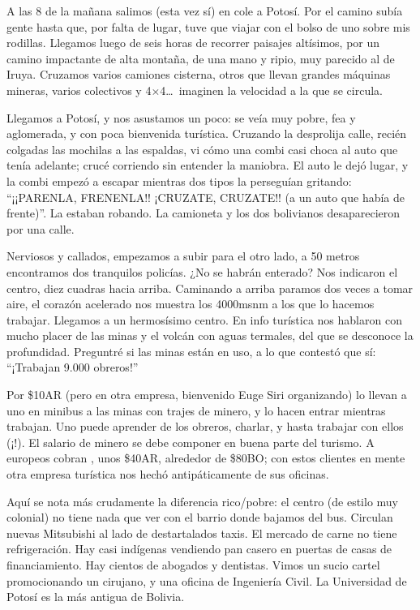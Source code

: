 A las 8 de la mañana salimos (esta vez sí) en cole a Potosí. Por el camino
subía gente hasta que, por falta de lugar, tuve que viajar con el bolso de uno
sobre mis rodillas. Llegamos luego de seis horas de recorrer paisajes
altísimos, por un camino impactante de alta montaña, de una mano y ripio, muy
parecido al de Iruya. Cruzamos varios camiones cisterna, otros que llevan
grandes máquinas mineras, varios colectivos y 4$\times$4\ldots\ imaginen la
velocidad a la que se circula.

Llegamos a Potosí, y nos asustamos un poco: se veía muy pobre, fea y
aglomerada, y con poca bienvenida turística. Cruzando la desprolija calle,
recién colgadas las mochilas a las espaldas, vi cómo una combi casi choca al
auto que tenía adelante; crucé corriendo sin entender la maniobra. El auto le
dejó lugar, y la combi empezó a escapar mientras dos tipos la perseguían
gritando: ``¡¡PARENLA, FRENENLA!! \textexclamdown
¡CRUZATE, CRUZATE!! (a un auto que había de frente)''. La
estaban robando. La camioneta y los dos bolivianos desaparecieron por una calle.

Nerviosos y callados, empezamos a subir para el otro lado, a 50 metros
encontramos dos tranquilos policías. ¿No se habrán enterado?
Nos indicaron el centro, diez cuadras hacia arriba. Caminando a arriba paramos
dos veces a tomar aire, el corazón acelerado nos muestra los 4000msnm a los que
lo hacemos trabajar. Llegamos a un hermosísimo centro. En info turística nos
hablaron con mucho placer de las minas y el volcán con aguas termales, del que
se desconoce la profundidad. Preguntré si las minas están en uso, a lo que
contestó que sí: ``¡Trabajan 9.000 obreros!''

Por \$10{\small AR} (pero en otra empresa, bienvenido Euge Siri
organizando) lo llevan a uno en minibus a las minas con trajes de minero, y lo
hacen entrar mientras trabajan. Uno puede aprender de los obreros, charlar, y
hasta trabajar con ellos (¡!). El salario de minero se debe
componer en buena parte del turismo. A europeos cobran , unos
\$40{\small AR}, alrededor de \$80{\small BO}; con estos clientes
en mente otra empresa turística nos hechó antipáticamente de sus oficinas.

Aquí se nota más crudamente la diferencia rico/pobre: el centro (de estilo muy
colonial) no tiene nada que ver con el barrio donde bajamos del bus. Circulan
nuevas Mitsubishi al lado de destartalados taxis. El mercado de carne no tiene
refrigeración. Hay casi indígenas vendiendo pan casero en puertas de casas de
financiamiento. Hay cientos de abogados y dentistas. Vimos un sucio cartel
promocionando un cirujano, y una oficina de Ingeniería Civil. La Universidad de
Potosí es la más antigua de Bolivia.


